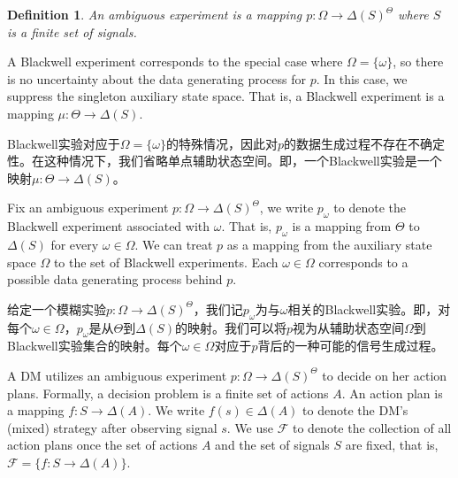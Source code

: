 \documentclass[12pt,a4paper]{article}
\newenvironment{original}
  {\par\vspace{4pt}\noindent\color{black}\ignorespaces}
  {\par\vspace{2pt}}
\newenvironment{translation}
  {\par\vspace{2pt}\noindent\color{myblue}\ignorespaces}
  {\par\vspace{6pt}}
\newtheorem{definition}[theorem]{Definition}
\newcommand{\Delt}{\Delta}
\newcommand{\calF}{\mathcal{F}}
\begin{document}
\begin{definition}
An ambiguous experiment is a mapping $p:\Omega\to\Delt(S)^{\Theta}$ where $S$ is a finite set of signals.
\end{definition}

\begin{original}
A Blackwell experiment corresponds to the special case where $\Omega=\{\omega\}$, so there is no uncertainty about the data generating process for $p$. In this case, we suppress the singleton auxiliary state space. That is, a Blackwell experiment is a mapping $\mu:\Theta\to\Delt(S)$.
\end{original}

\begin{translation}
Blackwell实验对应于$\Omega=\{\omega\}$的特殊情况，因此对$p$的数据生成过程不存在不确定性。在这种情况下，我们省略单点辅助状态空间。即，一个Blackwell实验是一个映射$\mu:\Theta\to\Delt(S)$。
\end{translation}

\begin{original}
Fix an ambiguous experiment $p:\Omega\to\Delt(S)^{\Theta}$, we write $p_{\omega}$ to denote the Blackwell experiment associated with $\omega$. That is, $p_{\omega}$ is a mapping from $\Theta$ to $\Delt(S)$ for every $\omega\in\Omega$. We can treat $p$ as a mapping from the auxiliary state space $\Omega$ to the set of Blackwell experiments. Each $\omega\in\Omega$ corresponds to a possible data generating process behind $p$.
\end{original}

\begin{translation}
给定一个模糊实验$p:\Omega\to\Delt(S)^{\Theta}$，我们记$p_{\omega}$为与$\omega$相关的Blackwell实验。即，对每个$\omega\in\Omega$，$p_{\omega}$是从$\Theta$到$\Delt(S)$的映射。我们可以将$p$视为从辅助状态空间$\Omega$到Blackwell实验集合的映射。每个$\omega\in\Omega$对应于$p$背后的一种可能的信号生成过程。
\end{translation}

\begin{original}
A DM utilizes an ambiguous experiment $p:\Omega\to\Delt(S)^{\Theta}$ to decide on her action plans. Formally, a decision problem is a finite set of actions $A$. An action plan is a mapping $f:S\to\Delt(A)$. We write $f(s)\in\Delt(A)$ to denote the DM's (mixed) strategy after observing signal $s$. We use $\calF$ to denote the collection of all action plans once the set of actions $A$ and the set of signals $S$ are fixed, that is, $\calF=\{f:S\to\Delt(A)\}$.
\end{original}
\end{document}

